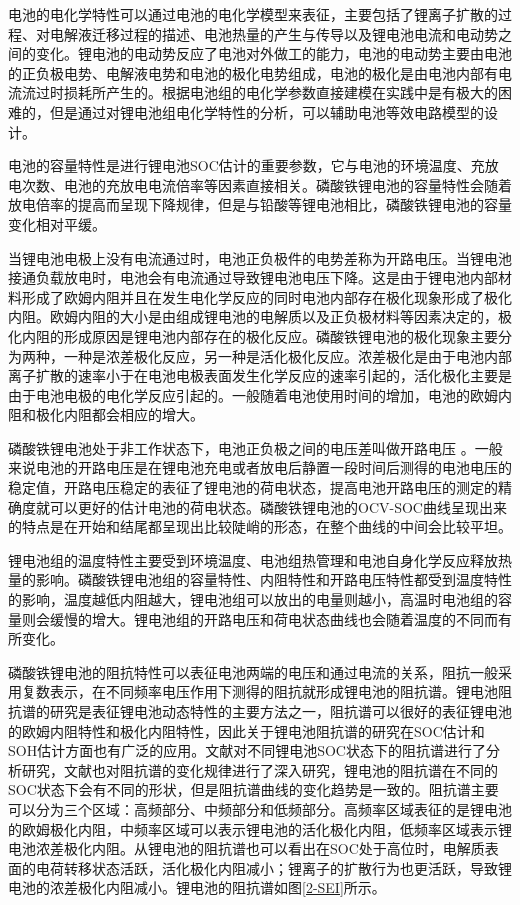 	电池的电化学特性可以通过电池的电化学模型来表征，主要包括了锂离子扩散的过程、对电解液迁移过程的描述、电池热量的产生与传导以及锂电池电流和电动势之间的变化。锂电池的电动势反应了电池对外做工的能力，电池的电动势主要由电池的正负极电势、电解液电势和电池的极化电势组成，电池的极化是由电池内部有电流流过时损耗所产生的。根据电池组的电化学参数直接建模在实践中是有极大的困难的，但是通过对锂电池组电化学特性的分析，可以辅助电池等效电路模型的设计。
\begin{enumerate}

	电池的容量特性是进行锂电池SOC估计的重要参数，它与电池的环境温度、充放电次数、电池的充放电电流倍率等因素直接相关。磷酸铁锂电池的容量特性会随着放电倍率的提高而呈现下降规律，但是与铅酸等锂电池相比，磷酸铁锂电池的容量变化相对平缓。

	当锂电池电极上没有电流通过时，电池正负极件的电势差称为开路电压。当锂电池接通负载放电时，电池会有电流通过导致锂电池电压下降。这是由于锂电池内部材料形成了欧姆内阻并且在发生电化学反应的同时电池内部存在极化现象形成了极化内阻。欧姆内阻的大小是由组成锂电池的电解质以及正负极材料等因素决定的，极化内阻的形成原因是锂电池内部存在的极化反应。磷酸铁锂电池的极化现象主要分为两种，一种是浓差极化反应，另一种是活化极化反应。浓差极化是由于电池内部 离子扩散的速率小于在电池电极表面发生化学反应的速率引起的，活化极化主要是由于电池电极的电化学反应引起的。一般随着电池使用时间的增加，电池的欧姆内阻和极化内阻都会相应的增大。

	磷酸铁锂电池处于非工作状态下，电池正负极之间的电压差叫做开路电压 。一般来说电池的开路电压是在锂电池充电或者放电后静置一段时间后测得的电池电压的稳定值，开路电压稳定的表征了锂电池的荷电状态，提高电池开路电压的测定的精确度就可以更好的估计电池的荷电状态。磷酸铁锂电池的OCV-SOC曲线呈现出来的特点是在开始和结尾都呈现出比较陡峭的形态，在整个曲线的中间会比较平坦。

	锂电池组的温度特性主要受到环境温度、电池组热管理和电池自身化学反应释放热量的影响。磷酸铁锂电池组的容量特性、内阻特性和开路电压特性都受到温度特性的影响，温度越低内阻越大，锂电池组可以放出的电量则越小，高温时电池组的容量则会缓慢的增大。锂电池组的开路电压和荷电状态曲线也会随着温度的不同而有所变化。
\end{enumerate}

磷酸铁锂电池的阻抗特性可以表征电池两端的电压和通过电流的关系，阻抗一般采用复数表示，在不同频率电压作用下测得的阻抗就形成锂电池的阻抗谱。锂电池阻抗谱的研究是表征锂电池动态特性的主要方法之一，阻抗谱可以很好的表征锂电池的欧姆内阻特性和极化内阻特性，因此关于锂电池阻抗谱的研究在SOC估计和SOH估计方面也有广泛的应用。文献对不同锂电池SOC状态下的阻抗谱进行了分析研究，文献也对阻抗谱的变化规律进行了深入研究，锂电池的阻抗谱在不同的SOC状态下会有不同的形状，但是阻抗谱曲线的变化趋势是一致的。阻抗谱主要可以分为三个区域：高频部分、中频部分和低频部分。高频率区域表征的是锂电池的欧姆极化内阻，中频率区域可以表示锂电池的活化极化内阻，低频率区域表示锂电池浓差极化内阻。从锂电池的阻抗谱也可以看出在SOC处于高位时，电解质表面的电荷转移状态活跃，活化极化内阻减小；锂离子的扩散行为也更活跃，导致锂电池的浓差极化内阻减小。锂电池的阻抗谱如图\ref{2-SEI}所示。

